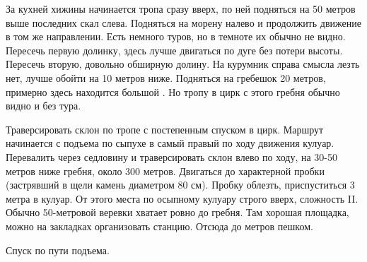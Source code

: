 За кухней хижины \geoLighthouse{} начинается тропа сразу вверх, по ней
подняться на 50 метров выше последних скал слева. Подняться на морену
налево и продолжить движение в том же направлении. Есть немного туров,
но в темноте их обычно не видно. Пересечь первую долинку, здесь лучше
двигаться по дуге без потери высоты. Пересечь вторую, довольно
обширную долину. На курумник справа смысла лезть нет, лучше обойти на
10 метров ниже. Подняться на гребешок 20 метров, примерно здесь
находится большой \geoStartOfKoshevoy[тур]. Но тропу в цирк
\geoPeakKoshevoy{} с этого гребня обычно видно и без тура.

Траверсировать склон по тропе с постепенным спуском в цирк. Маршрут
начинается с подъема по сыпухе в самый правый по ходу движения кулуар.
Перевалить через седловину и траверсировать склон влево по ходу, на
30-50 метров ниже гребня, около 300 метров. Двигаться до характерной
пробки (застрявший в щели камень диаметром 80 см). Пробку облезть,
приспуститься 3 метра в кулуар. От этого места по осыпному кулуару
строго вверх, сложность II. Обычно 50-метровой веревки хватает ровно
до гребня. Там хорошая площадка, можно на закладках организовать
станцию. Отсюда до  метров пешком.

Спуск по пути подъема.
